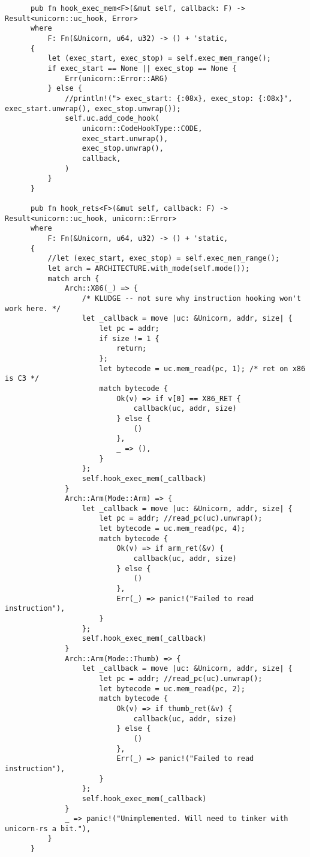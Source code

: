 \documentclass[11pt]{article}
\begin{document}
\begin{lstlisting}
      pub fn hook_exec_mem<F>(&mut self, callback: F) -> Result<unicorn::uc_hook, Error>
      where
          F: Fn(&Unicorn, u64, u32) -> () + 'static,
      {
          let (exec_start, exec_stop) = self.exec_mem_range();
          if exec_start == None || exec_stop == None {
              Err(unicorn::Error::ARG)
          } else {
              //println!("> exec_start: {:08x}, exec_stop: {:08x}", exec_start.unwrap(), exec_stop.unwrap());
              self.uc.add_code_hook(
                  unicorn::CodeHookType::CODE,
                  exec_start.unwrap(),
                  exec_stop.unwrap(),
                  callback,
              )
          }
      }

      pub fn hook_rets<F>(&mut self, callback: F) -> Result<unicorn::uc_hook, unicorn::Error>
      where
          F: Fn(&Unicorn, u64, u32) -> () + 'static,
      {
          //let (exec_start, exec_stop) = self.exec_mem_range();
          let arch = ARCHITECTURE.with_mode(self.mode());
          match arch {
              Arch::X86(_) => {
                  /* KLUDGE -- not sure why instruction hooking won't work here. */
                  let _callback = move |uc: &Unicorn, addr, size| {
                      let pc = addr;
                      if size != 1 {
                          return;
                      };
                      let bytecode = uc.mem_read(pc, 1); /* ret on x86 is C3 */
                      match bytecode {
                          Ok(v) => if v[0] == X86_RET {
                              callback(uc, addr, size)
                          } else {
                              ()
                          },
                          _ => (),
                      }
                  };
                  self.hook_exec_mem(_callback)
              }
              Arch::Arm(Mode::Arm) => {
                  let _callback = move |uc: &Unicorn, addr, size| {
                      let pc = addr; //read_pc(uc).unwrap();
                      let bytecode = uc.mem_read(pc, 4);
                      match bytecode {
                          Ok(v) => if arm_ret(&v) {
                              callback(uc, addr, size)
                          } else {
                              ()
                          },
                          Err(_) => panic!("Failed to read instruction"),
                      }
                  };
                  self.hook_exec_mem(_callback)
              }
              Arch::Arm(Mode::Thumb) => {
                  let _callback = move |uc: &Unicorn, addr, size| {
                      let pc = addr; //read_pc(uc).unwrap();
                      let bytecode = uc.mem_read(pc, 2);
                      match bytecode {
                          Ok(v) => if thumb_ret(&v) {
                              callback(uc, addr, size)
                          } else {
                              ()
                          },
                          Err(_) => panic!("Failed to read instruction"),
                      }
                  };
                  self.hook_exec_mem(_callback)
              }
              _ => panic!("Unimplemented. Will need to tinker with unicorn-rs a bit."),
          }
      }


\end{lstlisting}
\end{document}
